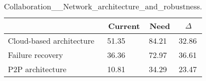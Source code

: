 
  \begin{table*}[]
  \centering
  \notsotiny
  \caption{ Collaboration__Network_architecture_and_robustness.}
\label{tab:collaboration__network_architecture_and_robustness}
\begin{tabular}{|l|l|l|l|}
  \hline
  \rowcolor[HTML]{C0C0C0}
    \multicolumn{1}{|c|}{Feature} & \multicolumn{1}{c|}{Current} & \multicolumn{1}{c|}{Need} & \multicolumn{1}{c|}{$\Delta$} \\ \hline
  Cloud-based architecture & 51.35 & 84.21 & 32.86 \\ \hline 
Failure recovery & 36.36 & 72.97 & 36.61 \\ \hline 
P2P architecture & 10.81 & 34.29 & 23.47 \\ \hline 
\end{tabular}%
  \end{table*}